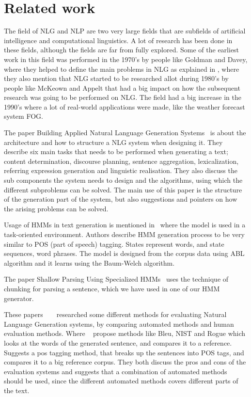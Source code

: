 \documentclass[a4paper,12pt]{article}
\begin{document}
\section{Related work}
\label{sec:relwork}

The field of NLG and NLP are two very large fields that are subfields of
artificial intelligence and computational linguistics. A lot of research has
been done in these fields, although the fields are far from fully explored. Some
of the earliest work in this field was performed in the 1970's by people like
Goldman and Davey, where they helped to define the main problems in NLG 
as explained in \cite[p.~19-20]{buildingNLG}, where they also mention that NLG
started to be researched allot during 1980's by people like McKeown and Appelt
that had a big impact on how the subsequent research was going to be performed on NLG.
The field had a big increase in the 1990's where a lot of real-world applications were made,
like the weather forecast system FOG.

The paper Building Applied Natural Language Generation
Systems~\cite{nlgsystem01} is about the architecture and how to structure a
NLG system when designing it. They describe six main tasks that needs to be
performed when generating a text; content determination, discourse planning,
sentence aggregation, lexicalization, referring expression generation and
linguistic realisation. They also discuss the sub components the system
needs to design and the algorithms, using which the different subproblems can be
solved. The main use of this paper is the structure of the generation part of
the system, but also suggestions and pointers on how the arising problems can be
solved.

Usage of HMMs in text generation is mentioned in~\cite{hmmnlg} where the model
is used in a task-oriented environment. Authors describe HMM generation process
to be very similar to POS (part of speech) tagging. States represent words, and
state sequences, word phrases. The model is designed from the corpus data
using ABL algorithm and it learns using the Baum-Welch algorithm.

The paper Shallow Parsing Using Specialized HMMs~\cite{hmmchunk} uses the technique
of chunking for parsing a sentence, which we have used in one of our HMM generator.

These papers  ~\cite{poseval} ~\cite{bleueval} researched some different methods
for evaluating Natural Language Generation systems, by comparing automated
methods and human evaluation methods. Where  ~\cite{bleueval} propose methods
like Bleu, NIST and Rogue which looks at the words of the generated sentence,
and compares it to a reference. ~\cite{poseval} Suggests a pos tagging method,
that breaks up the sentences into POS tags, and compares it to a big reference
corpus.
They both discuss the pros and cons of the evaluation systems and suggests that
a combination of automated methods should be used, since the different automated
methods covers different parts of the text.
\end{document}
